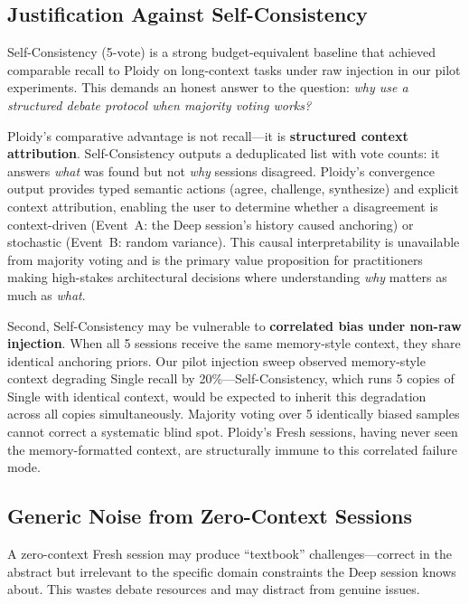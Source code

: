 \documentclass[11pt]{article}
\begin{document}
\subsection{Justification Against Self-Consistency}
\label{sec:vs-self-consistency}

Self-Consistency (5-vote) is a strong budget-equivalent baseline that achieved comparable recall to Ploidy on long-context tasks under raw injection in our pilot experiments. This demands an honest answer to the question: \emph{why use a structured debate protocol when majority voting works?}

Ploidy's comparative advantage is not recall---it is \textbf{structured context attribution}. Self-Consistency outputs a deduplicated list with vote counts: it answers \emph{what} was found but not \emph{why} sessions disagreed. Ploidy's convergence output provides typed semantic actions (agree, challenge, synthesize) and explicit context attribution, enabling the user to determine whether a disagreement is context-driven (Event~A: the Deep session's history caused anchoring) or stochastic (Event~B: random variance). This causal interpretability is unavailable from majority voting and is the primary value proposition for practitioners making high-stakes architectural decisions where understanding \emph{why} matters as much as \emph{what}.

Second, Self-Consistency may be vulnerable to \textbf{correlated bias under non-raw injection}. When all 5 sessions receive the same memory-style context, they share identical anchoring priors. Our pilot injection sweep observed memory-style context degrading Single recall by 20\%---Self-Consistency, which runs 5 copies of Single with identical context, would be expected to inherit this degradation across all copies simultaneously. Majority voting over 5 identically biased samples cannot correct a systematic blind spot. Ploidy's Fresh sessions, having never seen the memory-formatted context, are structurally immune to this correlated failure mode.

\subsection{Generic Noise from Zero-Context Sessions}
\label{sec:generic-noise}

A zero-context Fresh session may produce ``textbook'' challenges---correct in the abstract but irrelevant to the specific domain constraints the Deep session knows about. This wastes debate resources and may distract from genuine issues.
\end{document}
